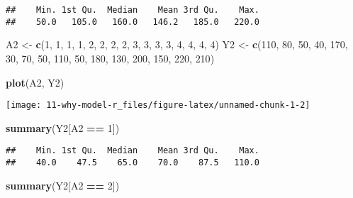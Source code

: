 \documentclass[
  10pt,
]{book}
\newenvironment{Shaded}{\begin{snugshade}}{\end{snugshade}}
\newcommand{\DecValTok}[1]{\textcolor[rgb]{0.00,0.00,0.81}{#1}}
\newcommand{\KeywordTok}[1]{\textcolor[rgb]{0.13,0.29,0.53}{\textbf{#1}}}
\newcommand{\NormalTok}[1]{#1}
\newcommand{\OperatorTok}[1]{\textcolor[rgb]{0.81,0.36,0.00}{\textbf{#1}}}
\newcommand{\StringTok}[1]{\textcolor[rgb]{0.31,0.60,0.02}{#1}}
\begin{document}
\begin{verbatim}
##    Min. 1st Qu.  Median    Mean 3rd Qu.    Max. 
##    50.0   105.0   160.0   146.2   185.0   220.0
\end{verbatim}

\begin{Shaded}
\begin{Highlighting}[]
\NormalTok{A2 <-}\StringTok{ }\KeywordTok{c}\NormalTok{(}\DecValTok{1}\NormalTok{, }\DecValTok{1}\NormalTok{, }\DecValTok{1}\NormalTok{, }\DecValTok{1}\NormalTok{, }\DecValTok{2}\NormalTok{, }\DecValTok{2}\NormalTok{, }\DecValTok{2}\NormalTok{, }\DecValTok{2}\NormalTok{, }\DecValTok{3}\NormalTok{, }\DecValTok{3}\NormalTok{, }\DecValTok{3}\NormalTok{, }\DecValTok{3}\NormalTok{, }\DecValTok{4}\NormalTok{, }\DecValTok{4}\NormalTok{, }\DecValTok{4}\NormalTok{, }\DecValTok{4}\NormalTok{)}
\NormalTok{Y2 <-}\StringTok{ }\KeywordTok{c}\NormalTok{(}\DecValTok{110}\NormalTok{, }\DecValTok{80}\NormalTok{, }\DecValTok{50}\NormalTok{, }\DecValTok{40}\NormalTok{, }\DecValTok{170}\NormalTok{, }\DecValTok{30}\NormalTok{, }\DecValTok{70}\NormalTok{, }\DecValTok{50}\NormalTok{, }\DecValTok{110}\NormalTok{, }\DecValTok{50}\NormalTok{, }\DecValTok{180}\NormalTok{,}
        \DecValTok{130}\NormalTok{, }\DecValTok{200}\NormalTok{, }\DecValTok{150}\NormalTok{, }\DecValTok{220}\NormalTok{, }\DecValTok{210}\NormalTok{)}

\KeywordTok{plot}\NormalTok{(A2, Y2)}
\end{Highlighting}
\end{Shaded}

\begin{center}\texttt{[image: 11-why-model-r\_files/figure-latex/unnamed-chunk-1-2]} \end{center}

\begin{Shaded}
\begin{Highlighting}[]
\KeywordTok{summary}\NormalTok{(Y2[A2 }\OperatorTok{==}\StringTok{ }\DecValTok{1}\NormalTok{])}
\end{Highlighting}
\end{Shaded}

\begin{verbatim}
##    Min. 1st Qu.  Median    Mean 3rd Qu.    Max. 
##    40.0    47.5    65.0    70.0    87.5   110.0
\end{verbatim}

\begin{Shaded}
\begin{Highlighting}[]
\KeywordTok{summary}\NormalTok{(Y2[A2 }\OperatorTok{==}\StringTok{ }\DecValTok{2}\NormalTok{])}
\end{Highlighting}
\end{Shaded}
\end{document}
